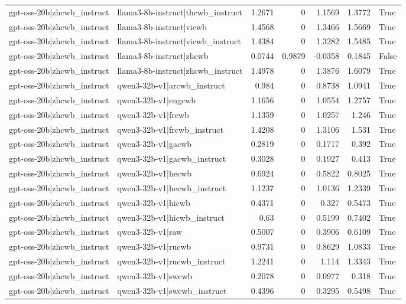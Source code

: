 \begin{table}
\begin{tabular}{l l r r r r l}
gpt-oss-20b|zhcwb_instruct & llama3-8b-instruct|thcwb_instruct & 1.2671 & 0 & 1.1569 & 1.3772 & True \\
gpt-oss-20b|zhcwb_instruct & llama3-8b-instruct|vicwb & 1.4568 & 0 & 1.3466 & 1.5669 & True \\
gpt-oss-20b|zhcwb_instruct & llama3-8b-instruct|vicwb_instruct & 1.4384 & 0 & 1.3282 & 1.5485 & True \\
gpt-oss-20b|zhcwb_instruct & llama3-8b-instruct|zhcwb & 0.0744 & 0.9879 & -0.0358 & 0.1845 & False \\
gpt-oss-20b|zhcwb_instruct & llama3-8b-instruct|zhcwb_instruct & 1.4978 & 0 & 1.3876 & 1.6079 & True \\
gpt-oss-20b|zhcwb_instruct & qwen3-32b-v1|arcwb_instruct & 0.984 & 0 & 0.8738 & 1.0941 & True \\
gpt-oss-20b|zhcwb_instruct & qwen3-32b-v1|engcwb & 1.1656 & 0 & 1.0554 & 1.2757 & True \\
gpt-oss-20b|zhcwb_instruct & qwen3-32b-v1|frcwb & 1.1359 & 0 & 1.0257 & 1.246 & True \\
gpt-oss-20b|zhcwb_instruct & qwen3-32b-v1|frcwb_instruct & 1.4208 & 0 & 1.3106 & 1.531 & True \\
gpt-oss-20b|zhcwb_instruct & qwen3-32b-v1|gacwb & 0.2819 & 0 & 0.1717 & 0.392 & True \\
gpt-oss-20b|zhcwb_instruct & qwen3-32b-v1|gacwb_instruct & 0.3028 & 0 & 0.1927 & 0.413 & True \\
gpt-oss-20b|zhcwb_instruct & qwen3-32b-v1|hecwb & 0.6924 & 0 & 0.5822 & 0.8025 & True \\
gpt-oss-20b|zhcwb_instruct & qwen3-32b-v1|hecwb_instruct & 1.1237 & 0 & 1.0136 & 1.2339 & True \\
gpt-oss-20b|zhcwb_instruct & qwen3-32b-v1|hicwb & 0.4371 & 0 & 0.327 & 0.5473 & True \\
gpt-oss-20b|zhcwb_instruct & qwen3-32b-v1|hicwb_instruct & 0.63 & 0 & 0.5199 & 0.7402 & True \\
gpt-oss-20b|zhcwb_instruct & qwen3-32b-v1|raw & 0.5007 & 0 & 0.3906 & 0.6109 & True \\
gpt-oss-20b|zhcwb_instruct & qwen3-32b-v1|rucwb & 0.9731 & 0 & 0.8629 & 1.0833 & True \\
gpt-oss-20b|zhcwb_instruct & qwen3-32b-v1|rucwb_instruct & 1.2241 & 0 & 1.114 & 1.3343 & True \\
gpt-oss-20b|zhcwb_instruct & qwen3-32b-v1|swcwb & 0.2078 & 0 & 0.0977 & 0.318 & True \\
gpt-oss-20b|zhcwb_instruct & qwen3-32b-v1|swcwb_instruct & 0.4396 & 0 & 0.3295 & 0.5498 & True \\

\end{tabular}
\end{table}
